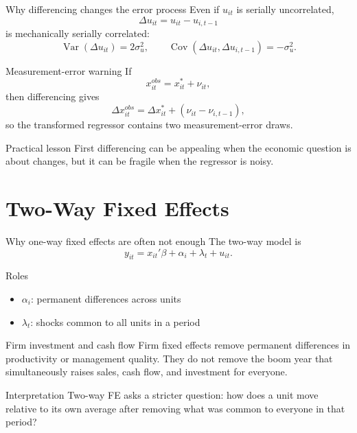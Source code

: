 \documentclass[10pt]{beamer}
\DeclareMathOperator{\Cov}{Cov}
\DeclareMathOperator{\Var}{Var}
\begin{document}
\begin{frame}{Why differencing changes the error process}
\label{slide:fdserial}
\small
Even if $u_{it}$ is serially uncorrelated,
\[
\Delta u_{it} = u_{it} - u_{i,t-1}
\]
is mechanically serially correlated:
\[
\Var(\Delta u_{it}) = 2\sigma_u^2,
\qquad
\Cov(\Delta u_{it}, \Delta u_{i,t-1}) = -\sigma_u^2.
\]

\pause
\begin{block}{Measurement-error warning}
If
\[
x_{it}^{obs} = x_{it}^{\ast} + \nu_{it},
\]
then differencing gives
\[
\Delta x_{it}^{obs} = \Delta x_{it}^{\ast} + (\nu_{it}-\nu_{i,t-1}),
\]
so the transformed regressor contains two measurement-error draws.
\end{block}

\pause
\begin{alertblock}{Practical lesson}
First differencing can be appealing when the economic question is about changes, but it can be fragile when the regressor is noisy.
\end{alertblock}

\hfill\hyperlink{app:fdserialproof}{}
\end{frame}

\section{Two-Way Fixed Effects}

\begin{frame}{Why one-way fixed effects are often not enough}
\label{slide:twfemotivation}
\small
The two-way model is
\[
y_{it} = x_{it}'\beta + \alpha_i + \lambda_t + u_{it}.
\]

\begin{block}{Roles}
\begin{itemize}
  \item $\alpha_i$: permanent differences across units
  \item $\lambda_t$: shocks common to all units in a period
\end{itemize}
\end{block}

\pause
\begin{exampleblock}{Firm investment and cash flow}
Firm fixed effects remove permanent differences in productivity or management quality. They do not remove the boom year that simultaneously raises sales, cash flow, and investment for everyone.
\end{exampleblock}

\pause
\begin{alertblock}{Interpretation}
Two-way FE asks a stricter question: how does a unit move relative to its own average after removing what was common to everyone in that period?
\end{alertblock}
\end{frame}
\end{document}
